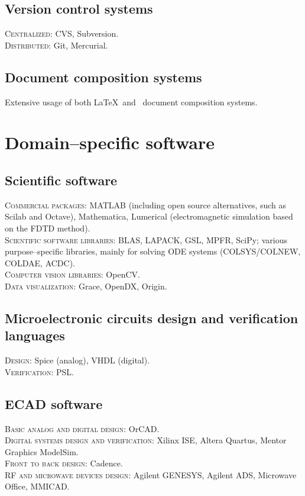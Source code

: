 \documentclass[11pt, a4paper]{article}
\begin{document}
\subsection*{Version control systems}
\noindent
	\textsc{Centralized}: CVS, Subversion.\\
	\textsc{Distributed}: Git, Mercurial.
\subsection*{Document composition systems}
\noindent
	Extensive usage of both \LaTeX\ and \XeTeX\ document composition systems.


\section*{Domain--specific software} %
\subsection*{Scientific software}
\noindent
	\textsc{Commercial packages}: MATLAB (including open source alternatives, such as Scilab and Octave), Mathematica, Lumerical (electromagnetic simulation based on the FDTD method).\\
	\textsc{Scientific software libraries}: BLAS, LAPACK, GSL, MPFR, SciPy; various purpose--specific libraries, mainly for solving ODE systems (COLSYS/COLNEW, COLDAE, ACDC).\\
	\textsc{Computer vision libraries}: OpenCV.\\
	\textsc{Data visualization}: Grace, OpenDX, Origin.
\subsection*{Microelectronic circuits design and verification languages}
\noindent
	\textsc{Design}: Spice (analog), VHDL (digital).\\
	\textsc{Verification}: PSL.
\subsection*{ECAD software}
\noindent
	\textsc{Basic analog and digital design}: OrCAD.\\
	\textsc{Digital systems design and verification}: Xilinx ISE, Altera Quartus, Mentor Graphics ModelSim.\\
	\textsc{Front to back design}: Cadence.\\
	\textsc{RF and microwave devices design}: Agilent GENESYS, Agilent ADS, Microwave Office, MMICAD.
\end{document}
